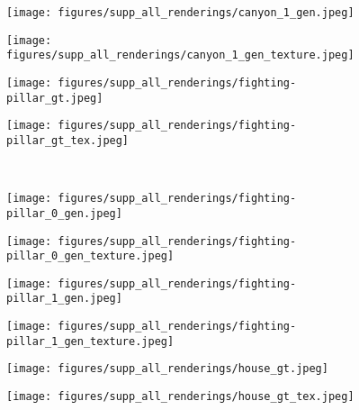 \begin{figure*}[!h]
\begin{subfigure}{.16\linewidth}
    \end{subfigure}
    \begin{subfigure}{.16\linewidth}
        \centering
        \texttt{[image: figures/supp\_all\_renderings/canyon\_1\_gen.jpeg]}
    \end{subfigure}
    \begin{subfigure}{.16\linewidth}
        \centering
        \texttt{[image: figures/supp\_all\_renderings/canyon\_1\_gen\_texture.jpeg]}
    \end{subfigure}
    \vspace*{-5mm} 
    \begin{subfigure}{.16\linewidth}
        \centering
        \texttt{[image: figures/supp\_all\_renderings/fighting-pillar\_gt.jpeg]}
    \end{subfigure}
    \begin{subfigure}{.16\linewidth}
        \centering
        \texttt{[image: figures/supp\_all\_renderings/fighting-pillar\_gt\_tex.jpeg]}
    \end{subfigure}
    \unskip\ \vrule\ 
    \begin{subfigure}{.16\linewidth}
        \centering
        \texttt{[image: figures/supp\_all\_renderings/fighting-pillar\_0\_gen.jpeg]}
    \end{subfigure}
    \begin{subfigure}{.16\linewidth}
        \centering
        \texttt{[image: figures/supp\_all\_renderings/fighting-pillar\_0\_gen\_texture.jpeg]}
    \end{subfigure}
    \begin{subfigure}{.16\linewidth}
        \centering
        \texttt{[image: figures/supp\_all\_renderings/fighting-pillar\_1\_gen.jpeg]}
    \end{subfigure}
    \begin{subfigure}{.16\linewidth}
        \centering
        \texttt{[image: figures/supp\_all\_renderings/fighting-pillar\_1\_gen\_texture.jpeg]}
    \end{subfigure}
    \vspace*{-5mm} 
    \begin{subfigure}{.16\linewidth}
        \centering
        \texttt{[image: figures/supp\_all\_renderings/house\_gt.jpeg]}
    \end{subfigure}
    \begin{subfigure}{.16\linewidth}
        \centering
        \texttt{[image: figures/supp\_all\_renderings/house\_gt\_tex.jpeg]}

\end{subfigure}
\end{figure*}
